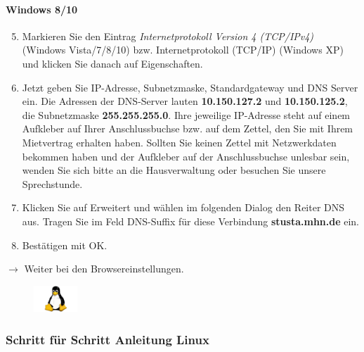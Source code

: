 \documentclass[a4paper,12pt]{scrartcl}
\begin{document}
\paragraph*{Windows 8/10}
\begin{enumerate}
    \setcounter{enumi}{4}
    \item Markieren Sie den Eintrag \textit{Internetprotokoll Version 4 (TCP/IPv4)} (Windows Vista/7/8/10) bzw. Internetprotokoll  (TCP/IP) (Windows XP) und klicken Sie danach auf Eigenschaften.
    \item Jetzt geben Sie IP-Adresse, Subnetzmaske, Standardgateway und DNS Server ein. Die Adressen der DNS-Server lauten \textbf{10.150.127.2} und \textbf{10.150.125.2}, die Subnetzmaske \textbf{255.255.255.0}. Ihre jeweilige IP-Adresse steht auf einem Aufkleber auf Ihrer Anschlussbuchse bzw. auf dem Zettel, den Sie mit Ihrem Mietvertrag erhalten haben. Sollten Sie keinen Zettel mit Netzwerkdaten bekommen haben und der Aufkleber auf der Anschlussbuchse unlesbar sein, wenden Sie sich bitte an die Hausverwaltung oder besuchen Sie unsere Sprechstunde.
    \item Klicken Sie auf Erweitert und wählen im folgenden Dialog den Reiter DNS aus. Tragen Sie im Feld DNS-Suffix für diese Verbindung \textbf{stusta.mhn.de} ein.
    \item Bestätigen mit OK.
\end{enumerate}
$\rightarrow$ Weiter bei den Browsereinstellungen.



\pagebreak

\begin{figure}[t!]
	\raggedleft
	\vspace{-20pt}
	\includegraphics[height=1cm,keepaspectratio]{Bilder/linux_logo_neu}
	\vspace{-30pt}
\end{figure}



\subsubsection*{Schritt für Schritt Anleitung Linux}
\end{document}
